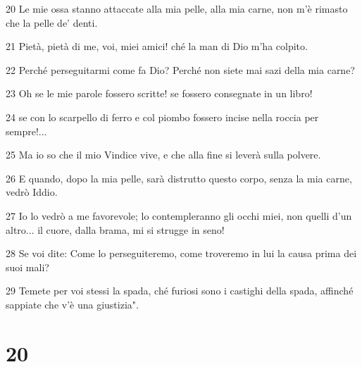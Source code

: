 \par 20 Le mie ossa stanno attaccate alla mia pelle, alla mia carne, non m'è rimasto che la pelle de' denti.
\par 21 Pietà, pietà di me, voi, miei amici! ché la man di Dio m'ha colpito.
\par 22 Perché perseguitarmi come fa Dio? Perché non siete mai sazi della mia carne?
\par 23 Oh se le mie parole fossero scritte! se fossero consegnate in un libro!
\par 24 se con lo scarpello di ferro e col piombo fossero incise nella roccia per sempre!...
\par 25 Ma io so che il mio Vindice vive, e che alla fine si leverà sulla polvere.
\par 26 E quando, dopo la mia pelle, sarà distrutto questo corpo, senza la mia carne, vedrò Iddio.
\par 27 Io lo vedrò a me favorevole; lo contempleranno gli occhi miei, non quelli d'un altro... il cuore, dalla brama, mi si strugge in seno!
\par 28 Se voi dite: Come lo perseguiteremo, come troveremo in lui la causa prima dei suoi mali?
\par 29 Temete per voi stessi la spada, ché furiosi sono i castighi della spada, affinché sappiate che v'è una giustizia".

\chapter{20}

